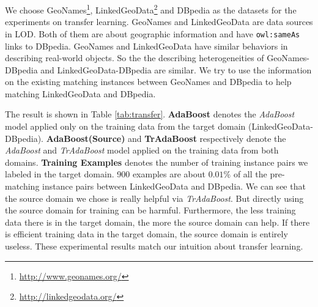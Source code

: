 We choose GeoNames\footnote{\url{http://www.geonames.org/}}, LinkedGeoData\footnote{\url{http://linkedgeodata.org/}} and DBpedia as the datasets for the experiments on transfer learning. GeoNames and LinkedGeoData are data sources in LOD. Both of them are about geographic information and have \texttt{owl:sameAs} links to DBpedia. GeoNames and LinkedGeoData have similar behaviors in describing real-world objects. So the the describing heterogeneities of GeoNames-DBpedia and LinkedGeoData-DBpedia are similar. We try to use the information on the existing matching instances between GeoNames and DBpedia to help matching LinkedGeoData and DBpedia.

The result is shown in Table \ref{tab:transfer}. \textbf{AdaBoost} denotes the \textit{AdaBoost} model applied only on the training data from the target domain (LinkedGeoData-DBpedia). \textbf{AdaBoost(Source)} and \textbf{TrAdaBoost} respectively denote the \textit{AdaBoost} and \textit{TrAdaBoost} model applied on the training data from both domains. \textbf{Training Examples} denotes the number of training instance pairs we labeled in the target domain. 900 examples are about $0.01\%$ of all the pre-matching instance pairs between LinkedGeoData and DBpedia. We can see that the source domain we chose is really helpful via \textit{TrAdaBoost}. But directly using the source domain for training can be harmful. Furthermore, the less training data there is in the target domain, the more the source domain can help. If there is efficient training data in the target domain, the source domain is entirely useless. These experimental results match our intuition about transfer learning.
